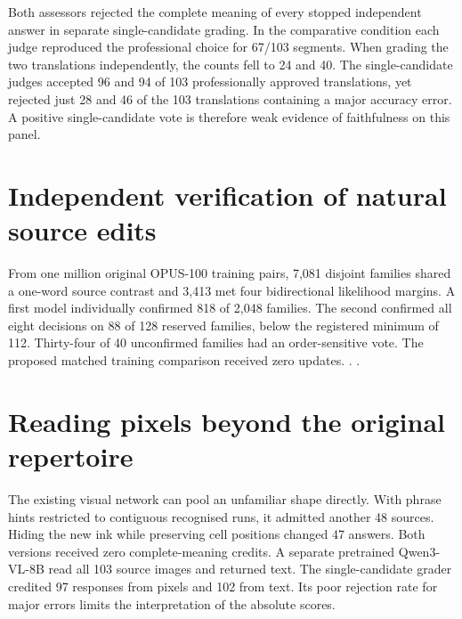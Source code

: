 Both assessors rejected the complete meaning of every stopped independent answer in separate single-candidate grading. In the comparative condition each judge reproduced the professional choice for 67/103 segments. When grading the two translations independently, the counts fell to 24 and 40. The single-candidate judges accepted 96 and 94 of 103 professionally approved translations, yet rejected just 28 and 46 of the 103 translations containing a major accuracy error. A positive single-candidate vote is therefore weak evidence of faithfulness on this panel.
\section*{Independent verification of natural source edits}
From one million original OPUS-100 training pairs, 7,081 disjoint families shared a one-word source contrast and 3,413 met four bidirectional likelihood margins. A first model individually confirmed 818 of 2,048 families. The second confirmed all eight decisions on 88 of 128 reserved families, below the registered minimum of 112. Thirty-four of 40 unconfirmed families had an order-sensitive vote. The proposed matched training comparison received zero updates. . .
\section*{Reading pixels beyond the original repertoire}
The existing visual network can pool an unfamiliar shape directly. With phrase hints restricted to contiguous recognised runs, it admitted another 48 sources. Hiding the new ink while preserving cell positions changed 47 answers. Both versions received zero complete-meaning credits. A separate pretrained Qwen3-VL-8B read all 103 source images and returned text. The single-candidate grader credited 97 responses from pixels and 102 from text. Its poor rejection rate for major errors limits the interpretation of the absolute scores.
